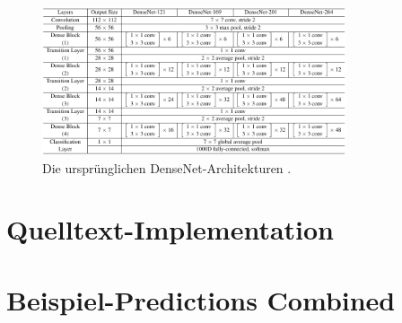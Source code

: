 \begin{figure}
	\centering
	\includegraphics[width=0.8\textwidth]{Bilder/densenet121-architecture.pdf} 
	\caption{Die ursprünglichen DenseNet-Architekturen \cite{Huang.25082016}.}
	\label{fig:densenet121-architecture}
\end{figure} 

\pagebreak

\section{Quelltext-Implementation}



\pagebreak 

\section{Beispiel-Predictions Combined} \label{sec:pred-combined}


